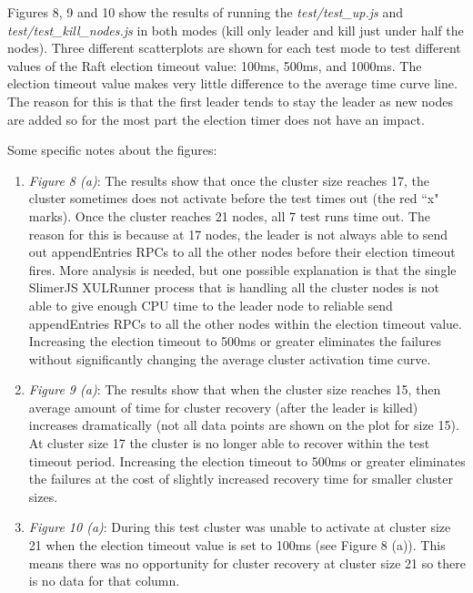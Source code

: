 \documentclass[9pt]{extarticle}
\begin{document}
\begin{multicols}{2}
Figures 8, 9 and 10 show the results of running the
\emph{test/test\_up.js} and \emph{test/test\_kill\_nodes.js} in both
modes (kill only leader and kill just under half the nodes). Three
different scatterplots are shown for each test mode to test different
values of the Raft election timeout value: 100ms, 500ms, and 1000ms.
The election timeout value makes very little difference to the average
time curve line. The reason for this is that the first leader tends to
stay the leader as new nodes are added so for the most part the
election timer does not have an impact.

Some specific notes about the figures:


\begin{enumerate}
    \item \emph{Figure 8 (a)}: The results show that once the cluster
        size reaches 17, the cluster sometimes does not activate
        before the test times out (the red ``x" marks). Once the
        cluster reaches 21 nodes, all 7 test runs time out. The reason
        for this is because at 17 nodes, the leader is not always able
        to send out appendEntries RPCs to all the other nodes before
        their election timeout fires. More analysis is needed, but one
        possible explanation is that the single SlimerJS XULRunner
        process that is handling all the cluster nodes is not able to
        give enough CPU time to the leader node to reliable send
        appendEntries RPCs to all the other nodes within the election
        timeout value. Increasing the election timeout to 500ms or
        greater eliminates the failures without significantly changing
        the average cluster activation time curve.
    \item \emph{Figure 9 (a)}: The results show that when the cluster
        size reaches 15, then average amount of time for cluster
        recovery (after the leader is killed) increases dramatically
        (not all data points are shown on the plot for size 15). At
        cluster size 17 the cluster is no longer able to recover
        within the test timeout period. Increasing the election
        timeout to 500ms or greater eliminates the failures at the
        cost of slightly increased recovery time for smaller cluster
        sizes.
    \item \emph{Figure 10 (a)}: During this test cluster was unable to
        activate at cluster size 21 when the election timeout value is
        set to 100ms (see Figure 8 (a)). This means there was no
        opportunity for cluster recovery at cluster size 21 so there
        is no data for that column.


\end{enumerate}
\end{multicols}
\end{document}

